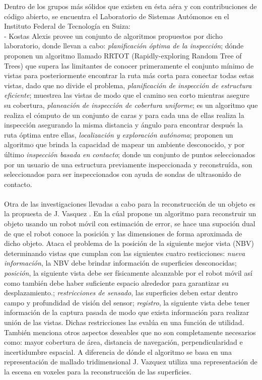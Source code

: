 \documentclass[]{report}
\begin{document}
Dentro de los grupos más sólidos que existen en ésta aéra y con contribuciones de código abierto, se encuentra el Laboratorio de Sistemas Autómonos en el Instituto Federal de Tecnología en Suiza:\\
- Kostas Alexis \cite{alexis2017realizing} provee un conjunto de algoritmos propuestos por dicho laboratorio, donde llevan a cabo: \textit{planificación óptima de la inspección}; dónde proponen un algoritmo llamado RRTOT (Rapidly-exploring Random Tree of Trees) que supera las limitantes de conocer primeramente el conjunto mínimo de vistas para posteriormente encontrar la ruta más corta para conectar todas estas vistas, dado que no divide el problema, \textit{planificación de inspección de estructura eficiente}; muestrea las vistas de modo que el camino sea corto mientras asegure su cobertura, \textit{planeación de inspección de cobertura uniforme}; es un algoritmo que realiza el cómputo de un conjunto de caras y para cada una de ellas realiza la inspección asegurando la misma distancia y ángulo para encontrar después la ruta óptima entre ellas, \textit{localización y exploración autónoma}; proponen un algoritmo que brinda la capacidad de mapear un ambiente desconocido, y por último \textit {inspección basada en contacto}; donde un conjunto de puntos seleccionados por un usuario de una estructura previamente inspeccionada y reconstruída, son seleccionados  para ser inspeccionados con ayuda de sondas de ultrasonido de contacto.\\\\
Otra de las investigaciones llevadas a cabo para la reconstrucción de un objeto es la propuesta de J. Vasquez \cite{vasquez2014volumetric}. En la cúal propone un algoritmo para reconstruir un objeto usando un robot móvil con estimación de error, se hace una supoción dual de que el robot conoce la posición y las dimensiones de forma aproximada de dicho objeto.  Ataca el problema de la posición de la siguiente mejor vista (NBV) determinando vistas que cumplan con las siguientes cuatro resticciones: \textit{nueva información}, la NBV debe brindar información de superficies desconocidas; \textit{posición}, la siguiente vista debe ser físicamente alcanzable por el robot móvil así como también debe haber suficiente espacio alrededor para garantizar  su desplazamiento.; \textit{restricciones de sensado}, las superficies deben estar dentro campo y profundidad de visión del sensor; \textit{registro}, la siguiente vista debe tener información de la captura pasada de modo que exista información para realizar unión de las vistas. Dichas restricciones las evalúa en una función de utilidad. También menciona otros aspectos deseables que no son completamente necesarios  como: mayor cobertura de área, distancia de navegación, perpendicularidad e incertidumbre espacial. A diferencia de \cite{liu2014flying} dónde el algoritmo se basa en una representación de mallado tridimensional J. Vazquez \cite{vasquez2014volumetric} utiliza una representación de la escena en voxeles para la reconstrucción de las superficies.
\end{document}
